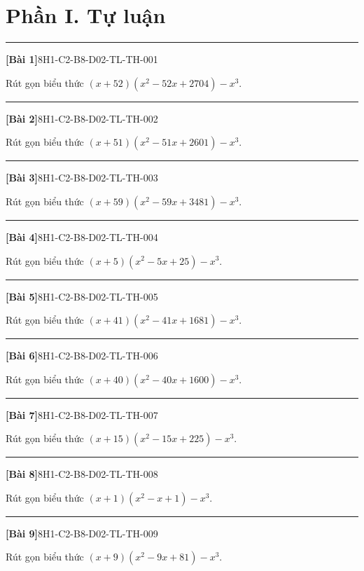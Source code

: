 \documentclass[12pt,a4paper]{article}
\newif\ifloigiai
\newenvironment{cauhoi}[2]{%
  \par\medskip\noindent\rule{\textwidth}{0.4pt}\par\nopagebreak
  \noindent\textbf{[#1]}\hfill{\scriptsize\ttfamily #2}\par\nopagebreak\smallskip}{\par}
\newcommand{\loigiai}[1]{\ifloigiai\par\smallskip\noindent\textit{Lời giải.} #1\par\fi}
\begin{document}
\section*{Phần I. Tự luận}
\begin{cauhoi}{Bài 1}{8H1-C2-B8-D02-TL-TH-001}
Rút gọn biểu thức $(x+52)(x^{2}-52x+2704)-x^{3}$.
\loigiai{Ta có $(x+52)(x^{2}-52x+2704)=x^{3}+140608$ nên biểu thức bằng $x^{3}+140608-x^{3}=140608$.}
\end{cauhoi}
\begin{cauhoi}{Bài 2}{8H1-C2-B8-D02-TL-TH-002}
Rút gọn biểu thức $(x+51)(x^{2}-51x+2601)-x^{3}$.
\loigiai{Ta có $(x+51)(x^{2}-51x+2601)=x^{3}+132651$ nên biểu thức bằng $x^{3}+132651-x^{3}=132651$.}
\end{cauhoi}
\begin{cauhoi}{Bài 3}{8H1-C2-B8-D02-TL-TH-003}
Rút gọn biểu thức $(x+59)(x^{2}-59x+3481)-x^{3}$.
\loigiai{Ta có $(x+59)(x^{2}-59x+3481)=x^{3}+205379$ nên biểu thức bằng $x^{3}+205379-x^{3}=205379$.}
\end{cauhoi}
\begin{cauhoi}{Bài 4}{8H1-C2-B8-D02-TL-TH-004}
Rút gọn biểu thức $(x+5)(x^{2}-5x+25)-x^{3}$.
\loigiai{Ta có $(x+5)(x^{2}-5x+25)=x^{3}+125$ nên biểu thức bằng $x^{3}+125-x^{3}=125$.}
\end{cauhoi}
\begin{cauhoi}{Bài 5}{8H1-C2-B8-D02-TL-TH-005}
Rút gọn biểu thức $(x+41)(x^{2}-41x+1681)-x^{3}$.
\loigiai{Ta có $(x+41)(x^{2}-41x+1681)=x^{3}+68921$ nên biểu thức bằng $x^{3}+68921-x^{3}=68921$.}
\end{cauhoi}
\begin{cauhoi}{Bài 6}{8H1-C2-B8-D02-TL-TH-006}
Rút gọn biểu thức $(x+40)(x^{2}-40x+1600)-x^{3}$.
\loigiai{Ta có $(x+40)(x^{2}-40x+1600)=x^{3}+64000$ nên biểu thức bằng $x^{3}+64000-x^{3}=64000$.}
\end{cauhoi}
\begin{cauhoi}{Bài 7}{8H1-C2-B8-D02-TL-TH-007}
Rút gọn biểu thức $(x+15)(x^{2}-15x+225)-x^{3}$.
\loigiai{Ta có $(x+15)(x^{2}-15x+225)=x^{3}+3375$ nên biểu thức bằng $x^{3}+3375-x^{3}=3375$.}
\end{cauhoi}
\begin{cauhoi}{Bài 8}{8H1-C2-B8-D02-TL-TH-008}
Rút gọn biểu thức $(x+1)(x^{2}-x+1)-x^{3}$.
\loigiai{Ta có $(x+1)(x^{2}-x+1)=x^{3}+1$ nên biểu thức bằng $x^{3}+1-x^{3}=1$.}
\end{cauhoi}
\begin{cauhoi}{Bài 9}{8H1-C2-B8-D02-TL-TH-009}
Rút gọn biểu thức $(x+9)(x^{2}-9x+81)-x^{3}$.
\loigiai{Ta có $(x+9)(x^{2}-9x+81)=x^{3}+729$ nên biểu thức bằng $x^{3}+729-x^{3}=729$.}
\end{cauhoi}
\end{document}

